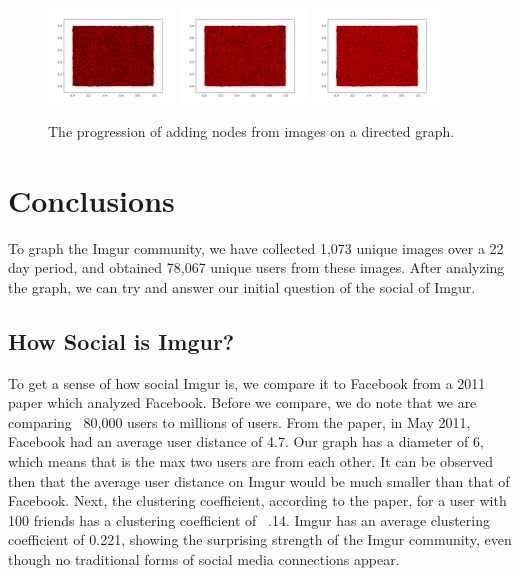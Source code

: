 \documentclass{article}
\begin{document}
\begin{figure}[h!]
    \includegraphics[width=0.3\textwidth]{DirectedImgurGraph35.png}
    \includegraphics[width=0.3\textwidth]{DirectedImgurGraph40.png}
    \includegraphics[width=0.3\textwidth]{DirectedImgurGraph45.png}
    \caption{The progression of adding nodes from images on a directed graph.}
    \label{post545Directed}
\end{figure}


\section{Conclusions}
\par To graph the Imgur community, we have collected 1,073 unique images over a 22 day period, and obtained 78,067 unique users from these images. After analyzing the graph, we can try and answer our initial question of the social of Imgur.

\subsection{How Social is Imgur?}
\par To get a sense of how social Imgur is, we compare it to Facebook from a 2011 paper which analyzed Facebook\cite{DBLP:journals/corr/abs-1111-4503}. Before we compare, we do note that we are comparing ~80,000 users to millions of users. From the paper, in May 2011, Facebook had an average user distance of 4.7. Our graph has a diameter of 6, which means that is the max two users are from each other. It can be observed then that the average user distance on Imgur would be much smaller than that of Facebook. Next, the clustering coefficient, according to the paper, for a user with 100 friends has a clustering coefficient of ~.14. Imgur has an average clustering coefficient of 0.221, showing the surprising strength of the Imgur community, even though no traditional forms of social media connections appear. 
\end{document}
